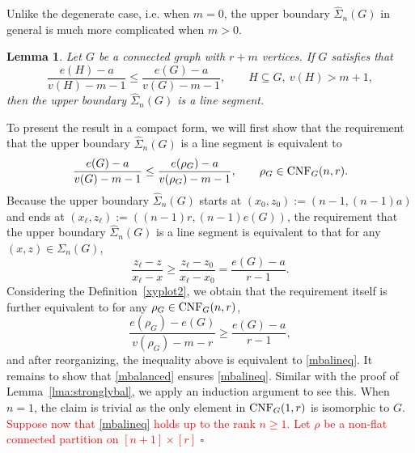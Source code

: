 \documentclass[12pt]{article}
\newtheorem{lemma}[prop]{Lemma}
\newenvironment{Proof}{\removelastskip\par\medskip
\noindent{\em Proof.} \rm}{\penalty-20\null\hfill$\square$\par\medbreak}
\numberwithin{equation}{section}
\begin{document}
Unlike the degenerate case, i.e. when $m=0$, the upper boundary $\widehat{\Sigma}_n(G)$ in general is much more complicated when $m>0$. %

\begin{lemma}\label{lma:mbal}
  Let $G$ be a connected graph with $r+m$ vertices. If $G$ satisfies that 
  \begin{equation}\label{mbalanced}
    \frac{e(H)-a}{v(H)-m-1}\le\frac{e(G)-a}{v(G)-m-1},\qquad H\subseteq G,~v(H)>m+1,
  \end{equation} 
  then the upper boundary $\widehat{\Sigma}_n(G)$ is a line segment. 
\end{lemma}
\begin{Proof}
  To present the result in a compact form, we will first show that the requirement that the upper boundary $\widehat{\Sigma}_n(G)$ is a line segment is equivalent to 
  \begin{equation}
    \label{mbalineq}
      \frac{e(G)-a}{v(G)-m-1}\le\frac{e(\rho_G)-a}{v(\rho_G)-m-1},
      \qquad
  \rho_G\in {\rm CNF}_G(n,r).
    \end{equation}
    Because the upper boundary $\widehat{\Sigma}_n(G)$ starts at $(x_0,z_0):=(n-1,(n-1)a)$ and ends at $(x_\ell,z_\ell):=((n-1)r,(n-1)e(G))$, the requirement that the upper boundary $\widehat{\Sigma}_n(G)$ is a line segment is equivalent to that for any $(x,z)\in\Sigma_n(G)$, 
    \begin{equation}
      \frac{z_\ell-z}{x_\ell-x}\ge\frac{z_\ell-z_0}{x_\ell-x_0}=\frac{e(G)-a}{r-1}.
    \end{equation}
    Considering the Definition~\ref{xyplot2}, we obtain that the requirement itself is further equivalent to for any $\rho_G\in {\rm CNF}_G(n,r)$, 
    \begin{equation}
      \frac{e(\rho_G)-e(G)}{v(\rho_G)-m-r}\ge \frac{e(G)-a}{r-1},
    \end{equation}
    and after reorganizing, the inequality above is equivalent to \eqref{mbalineq}. It remains to show that \eqref{mbalanced} ensures \eqref{mbalineq}. Similar with the proof of Lemma~\ref{lma:stronglybal}, we apply an induction argument to see this. When $n=1$, the claim is trivial as the only element in ${\rm CNF}_G(1,r)$ is isomorphic to $G$. \textcolor{red}{
      Suppose now that \eqref{mbalineq} holds up to the rank $n\geq 1$.
  Let $\rho$ be a non-flat connected partition on $[n+1]\times[r]$
}
\end{Proof}
\end{document}
